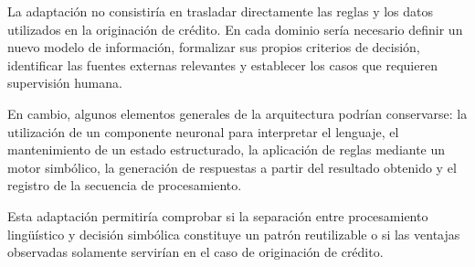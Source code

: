 \documentclass[12pt,a4paper]{report}
\begin{document}
La adaptación no consistiría en trasladar directamente las reglas y los datos utilizados en la originación de crédito. En cada dominio sería necesario definir un nuevo modelo de información, formalizar sus propios criterios de decisión, identificar las fuentes externas relevantes y establecer los casos que requieren supervisión humana.

En cambio, algunos elementos generales de la arquitectura podrían conservarse: la utilización de un componente neuronal para interpretar el lenguaje, el mantenimiento de un estado estructurado, la aplicación de reglas mediante un motor simbólico, la generación de respuestas a partir del resultado obtenido y el registro de la secuencia de procesamiento. 

Esta adaptación permitiría comprobar si la separación entre procesamiento lingüístico y decisión simbólica constituye un patrón reutilizable o si las ventajas observadas solamente servirían en el caso de originación de crédito.

\appendix




\end{document}
